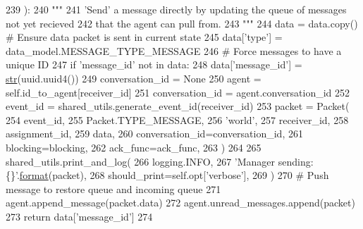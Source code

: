 \begin{DoxyCode}
239     ):
240         \textcolor{stringliteral}{"""}
241 \textcolor{stringliteral}{        'Send' a message directly by updating the queue of messages not yet recieved}
242 \textcolor{stringliteral}{        that the agent can pull from.}
243 \textcolor{stringliteral}{        """}
244         data = data.copy()  \textcolor{comment}{# Ensure data packet is sent in current state}
245         data[\textcolor{stringliteral}{'type'}] = data\_model.MESSAGE\_TYPE\_MESSAGE
246         \textcolor{comment}{# Force messages to have a unique ID}
247         \textcolor{keywordflow}{if} \textcolor{stringliteral}{'message\_id'} \textcolor{keywordflow}{not} \textcolor{keywordflow}{in} data:
248             data[\textcolor{stringliteral}{'message\_id'}] = \hyperlink{namespacegenerate__task__READMEs_a5b88452ffb87b78c8c85ececebafc09f}{str}(uuid.uuid4())
249         conversation\_id = \textcolor{keywordtype}{None}
250         agent = self.id\_to\_agent[receiver\_id]
251         conversation\_id = agent.conversation\_id
252         event\_id = shared\_utils.generate\_event\_id(receiver\_id)
253         packet = Packet(
254             event\_id,
255             Packet.TYPE\_MESSAGE,
256             \textcolor{stringliteral}{'world'},
257             receiver\_id,
258             assignment\_id,
259             data,
260             conversation\_id=conversation\_id,
261             blocking=blocking,
262             ack\_func=ack\_func,
263         )
264 
265         shared\_utils.print\_and\_log(
266             logging.INFO,
267             \textcolor{stringliteral}{'Manager sending: \{\}'}.\hyperlink{namespaceparlai_1_1chat__service_1_1services_1_1messenger_1_1shared__utils_a32e2e2022b824fbaf80c747160b52a76}{format}(packet),
268             should\_print=self.opt[\textcolor{stringliteral}{'verbose'}],
269         )
270         \textcolor{comment}{# Push message to restore queue and incoming queue}
271         agent.append\_message(packet.data)
272         agent.unread\_messages.append(packet)
273         \textcolor{keywordflow}{return} data[\textcolor{stringliteral}{'message\_id'}]
274 
\end{DoxyCode}
\mbox{\label{classparlai_1_1mturk_1_1webapp_1_1run__mocks_1_1mock__turk__manager_1_1MockTurkManager_a94b983f0d3a8c8fac19bc24ff62eacbd}} 
